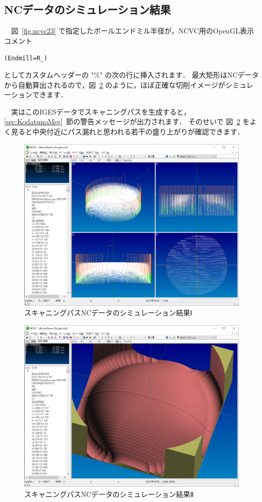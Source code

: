 \subsection{NCデータのシミュレーション結果}
　図~\ref{fig:ncvc23} で指定したボールエンドミル半径が，NCVC用のOpenGL表示コメント

\vspace*{0.5zh}
\begin{breakbox}
\vspace*{-0.25cm}
\small
\begin{alltt}
(Endmill=R_)
\end{alltt}
\vspace*{-0.1cm}
\end{breakbox}

としてカスタムヘッダーの "\%" の次の行に挿入されます．
最大矩形はNCデータから自動算出されるので，図~\ref{fig:ncvc29} のように，ほぼ正確な切削イメージがシミュレーションできます．

　実はこのIGESデータでスキャニングパスを生成すると，\ref{sec:KodatunoMsg}~節の警告メッセージが出力されます．
そのせいで 図~\ref{fig:ncvc29} をよく見ると中央付近にパス漏れと思われる若干の盛り上がりが確認できます．

\begin{figure}[H]
\centering
\includegraphics[scale=0.5]{No2/fig/fig28.png}
\caption{スキャニングパスNCデータのシミュレーション結果Ⅰ}
\label{fig:ncvc28}
\end{figure}

\begin{figure}[H]
\centering
\includegraphics[scale=0.5]{No2/fig/fig29.png}
\caption{スキャニングパスNCデータのシミュレーション結果Ⅱ}
\label{fig:ncvc29}
\end{figure}
